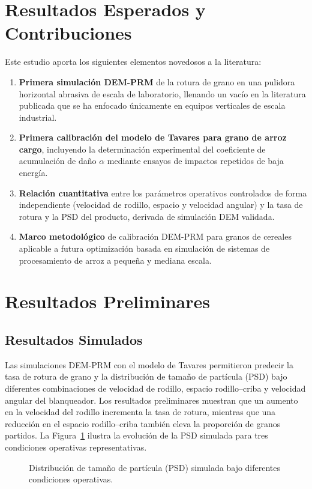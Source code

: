 \documentclass[conference]{IEEEtran}
\begin{document}
\section{Resultados Esperados y Contribuciones}
Este estudio aporta los siguientes elementos novedosos a la literatura:
\begin{enumerate}[noitemsep]
\item \textbf{Primera simulación DEM-PRM} de la rotura de grano en una pulidora horizontal abrasiva de escala de laboratorio, llenando un vacío en la literatura publicada que se ha enfocado únicamente en equipos verticales de escala industrial.
\item \textbf{Primera calibración del modelo de Tavares para grano de arroz cargo}, incluyendo la determinación experimental del coeficiente de acumulación de daño $\alpha$ mediante ensayos de impactos repetidos de baja energía.
\item \textbf{Relación cuantitativa} entre los parámetros operativos controlados de forma independiente (velocidad de rodillo, espacio y velocidad angular) y la tasa de rotura y la PSD del producto, derivada de simulación DEM validada.
\item \textbf{Marco metodológico} de calibración DEM-PRM para granos de cereales aplicable a futura optimización basada en simulación de sistemas de procesamiento de arroz a pequeña y mediana escala.
\end{enumerate}


\section{Resultados Preliminares}
\subsection{Resultados Simulados}
Las simulaciones DEM-PRM con el modelo de Tavares permitieron predecir la tasa de rotura de grano y la distribución de tamaño de partícula (PSD) bajo diferentes combinaciones de velocidad de rodillo, espacio rodillo--criba y velocidad angular del blanqueador. Los resultados preliminares muestran que un aumento en la velocidad del rodillo incrementa la tasa de rotura, mientras que una reducción en el espacio rodillo--criba también eleva la proporción de granos partidos. La Figura~\ref{fig:simulacion} ilustra la evolución de la PSD simulada para tres condiciones operativas representativas.

\begin{figure}[h]
	\centering
	\caption{Distribución de tamaño de partícula (PSD) simulada bajo diferentes condiciones operativas.}
	\label{fig:simulacion}
\end{figure}
\end{document}
